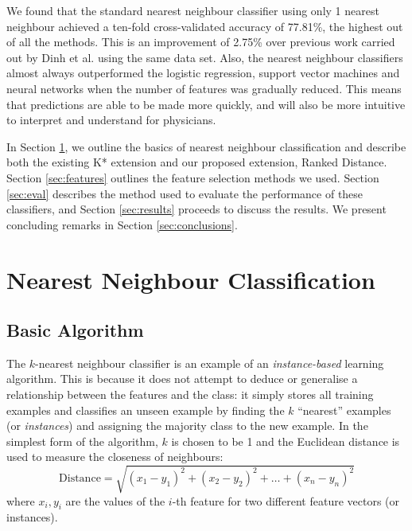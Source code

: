 \documentclass{article}
\begin{document}
We found that the standard nearest neighbour classifier using only 1 nearest
neighbour achieved a ten-fold cross-validated accuracy of 77.81\%, the highest
out of all the methods. This is an improvement of 2.75\% over previous work
carried out by Dinh et al. \citep{Dinh2013a} using the same data set. Also, the
nearest neighbour classifiers almost always outperformed the logistic
regression, support vector machines and neural networks when the number of
features was gradually reduced. This means that predictions are able to be made
more quickly, and will also be more intuitive to interpret and understand for
physicians.

In Section \ref{sec:nn}, we outline the basics of nearest neighbour
classification and describe both the existing K* extension and our proposed
extension, Ranked Distance. Section \ref{sec:features} outlines the feature
selection methods we used. Section \ref{sec:eval} describes the method used
to evaluate the performance of these classifiers, and Section \ref{sec:results}
proceeds to discuss the results. We present concluding remarks in Section
\ref{sec:conclusions}.

\section{Nearest Neighbour Classification}
\label{sec:nn}

\subsection{Basic Algorithm}
The $k$-nearest neighbour classifier is an example of an
\textit{instance-based} learning algorithm. This is because it does not attempt
to deduce or
generalise a relationship between the features and the class: it simply stores
all training examples and classifies an unseen example by finding the $k$
``nearest'' examples (or \textit{instances}) and assigning the majority class
to the new example. In the simplest form of the algorithm, $k$ is chosen to be
1 and the Euclidean distance is used to measure the closeness of neighbours:
\begin{equation*}
\mathrm{Distance} = \sqrt{(x_1-y_1)^2 + (x_2-y_2)^2 + \ldots + (x_n-y_n)^2}
\end{equation*}
where $x_i,y_i$ are the values of the $i$-th feature for two different feature
vectors (or instances).
\end{document}
